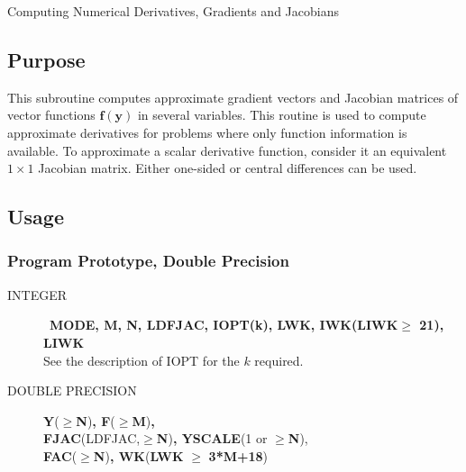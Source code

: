 \documentclass[twoside]{MATH77}
\begin{document}
 Computing Numerical Derivatives, Gradients and Jacobians

\subsection{Purpose}

This subroutine computes approximate gradient vectors and Jacobian matrices of
vector functions $\mathbf{f}(\mathbf{y})$ in several variables.  This routine
is used to compute approximate derivatives for problems where only function
information is available.  To approximate a scalar derivative function,
consider it an equivalent $1 \times 1$ Jacobian matrix.  Either one-sided or
central differences can be used.

\subsection{Usage}

\subsubsection{Program Prototype, Double Precision}
\begin{description}
\item[INTEGER]  \ {\bf MODE, M, N, LDFJAC, IOPT(k),
 LWK, IWK({\bf LIWK}$\geq$ 21), LIWK}\\
See the description of IOPT for the $k$ required.

\item[DOUBLE PRECISION]  {\bf Y}($\geq${\bf N}){\bf , F}($\geq${\bf M}){\bf ,\\
 FJAC}(LDFJAC,$\geq${\bf N}){\bf , YSCALE}(1 or $\geq${\bf N}),\\
  {\bf FAC}($\geq${\bf N}){\bf , WK}({\bf LWK} $\geq$ {\bf 3*M+18})
\end{description}\vspace{-10pt}
\end{document}
